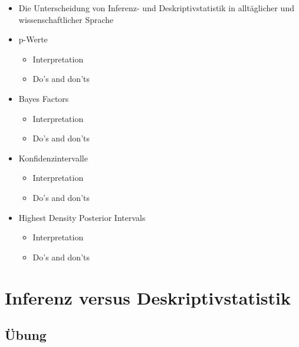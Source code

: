 \documentclass[
  letterpaper,
  DIV=11]{scrreprt}
\providecommand{\tightlist}{%
  \setlength{\itemsep}{0pt}\setlength{\parskip}{0pt}}\usepackage{longtable,booktabs,array}
\begin{document}
\begin{itemize}
\tightlist
\item
  Die Unterscheidung von Inferenz- und Deskriptivstatistik in
  alltäglicher und wissenschaftlicher Sprache
  \href{Inferenz_versus_Deskriptivstatistik.qmd}{}
\item
  p-Werte \href{p-Werte.qmd}{}

  \begin{itemize}
  \tightlist
  \item
    Interpretation
  \item
    Do's and don'ts
  \end{itemize}
\item
  Bayes Factors \href{Bayes\%20Factors.qmd}{}

  \begin{itemize}
  \tightlist
  \item
    Interpretation
  \item
    Do's and don'ts\\
  \end{itemize}
\item
  Konfidenzintervalle
  \href{Konfidenzintervalle.qmd}{}

  \begin{itemize}
  \tightlist
  \item
    Interpretation
  \item
    Do's and don'ts
  \end{itemize}
\item
  Highest Density Posterior Intervals
  \href{Highest\%20Density\%20Posterior\%20Intervals.qmd}{}

  \begin{itemize}
  \tightlist
  \item
    Interpretation
  \item
    Do's and don'ts
  \end{itemize}
\end{itemize}


\chapter{Inferenz versus
Deskriptivstatistik}\label{sec-Inferenz_versus_Deskriptivstatistik}

\section{Übung}\label{uxfcbung}
\end{document}
